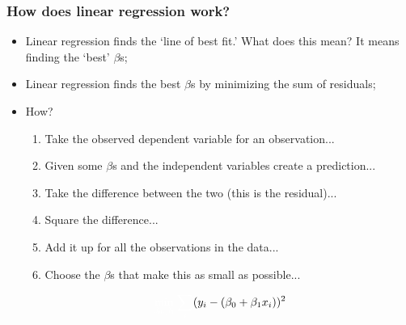 \documentclass[aspectratio=169]{beamer}
\theoremstyle{principle}
\begin{document}
\begin{frame}
\frametitle{How does linear regression work?}

\begin{itemize}
\item Linear regression finds the `line of best fit.'  What does this mean?  It means finding the `best' $\beta$s;
\bigskip

\item Linear regression finds the best $\beta$s by minimizing the sum of residuals;
\bigskip

\item How?
\begin{enumerate}
\item Take the observed dependent variable for an observation...
\item Given some $\beta$s and the independent variables create a prediction...
\item Take the difference between the two (this is the residual)...
\item Square the difference...
\item[]\color{white} Add it up for all the observations in the data...
\item[]\color{white} Choose the $\beta$s that make this as small as possible...
\end{enumerate}
\begin{align*}
\color{white}\min_{\beta_0,\beta_1}\sum_i\color{black}(y_i - (\beta_0 + \beta_1 x_i))^2
\end{align*}
\end{itemize}

\end{frame}
\end{document}
